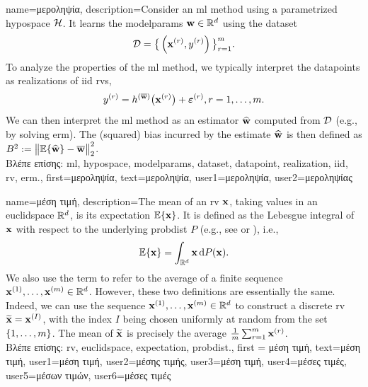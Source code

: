 {name={\foreignlanguage{greek}{μεροληψία}},
	description={Consider an \gls{ml} method using a parametrized \gls{hypospace} $\mathcal{H}$. 
		It learns the \gls{modelparams} ${\bf w} \in \mathbb{R}^{d}$ using the \gls{dataset} 
		$$ \mathcal{D}=\big\{ \left( {\bf x}^{(r)},y^{(r)} \right) \big\}_{r=1}^{m}.$$ 
		To analyze the properties of the \gls{ml} method, we typically interpret the \gls{datapoint}s as \gls{realization}s 
		of \gls{iid} \gls{rv}s, 
		$$ y^{(r)} = h^{(\overline{{\bf w}})}\big( {\bf x}^{(r)} \big) + \bm{\varepsilon}^{(r)}, r=1,\ldots,m.$$ 
		We can then interpret the \gls{ml} method as an estimator $\widehat{{\bf w}}$ 
		computed from $\mathcal{D}$ (e.g., by solving \gls{erm}). The (squared) bias incurred by the estimate $\widehat{{\bf w}}$ 
		is then defined as $B^{2} := \big\| \mathbb{E} \{ \widehat{{\bf w}}  \}- \overline{{\bf w}}\big\|_{2}^{2}$.\\
		\foreignlanguage{greek}{Βλέπε επίσης:} \gls{ml}, \gls{hypospace}, \gls{modelparams}, \gls{dataset}, \gls{datapoint}, \gls{realization}, \gls{iid}, \gls{rv}, \gls{erm}.},
first={\foreignlanguage{greek}{μεροληψία}},
text={\foreignlanguage{greek}{μεροληψία}},
user1={\foreignlanguage{greek}{μεροληψία}}, %
user2={\foreignlanguage{greek}{μεροληψίας}} %
}

{name={\foreignlanguage{greek}{μέση τιμή}},
	description={The  mean of an \gls{rv} ${\bf x}$, taking 
 		values in an \gls{euclidspace} $\mathbb{R}^{d}$, is its 
 		\gls{expectation} $\mathbb{E}\{{\bf x}\}$. It is defined as the Lebesgue 
 		integral of ${\bf x}$ with respect to the underlying \gls{probdist} $P$ (e.g., see \cite{BillingsleyProbMeasure} or \cite{RudinBookPrinciplesMatheAnalysis}), i.e.,
		\[
		\mathbb{E}\{{\bf x}\} = \int_{\mathbb{R}^{d}} {\bf x} \, \mathrm{d}P({\bf x}).
		\] 
		We also use the term to refer to the average of a finite sequence 
		${\bf x}^{(1)}, \ldots, {\bf x}^{(m)} \in \mathbb{R}^{d}$. However, 
		these two definitions are essentially the same. Indeed, we can use the sequence 
		${\bf x}^{(1)}, \ldots, {\bf x}^{(m)} \in \mathbb{R}^{d}$ to construct a 
		discrete \gls{rv} $\widetilde{{\bf x}}={\bf x}^{(I)}$, with the index $I$ being chosen uniformly 
		at random from the set $\{1,\ldots,m\}$. The mean of $\widetilde{{\bf x}}$ is 
		precisely the average $\frac{1}{m} \sum_{r=1}^{m} {\bf x}^{(r)}$.\\
	\foreignlanguage{greek}{Βλέπε επίσης:} \gls{rv}, \gls{euclidspace}, \gls{expectation}, \gls{probdist}.}, 
		first = {\foreignlanguage{greek}{μέση τιμή}}, 
		text={\foreignlanguage{greek}{μέση τιμή}},
		user1={\foreignlanguage{greek}{μέση τιμή}}, %
   		user2={\foreignlanguage{greek}{μέσης τιμής}}, %
		user3={\foreignlanguage{greek}{μέση τιμή}}, %
		user4={\foreignlanguage{greek}{μέσες τιμές}}, %
   		user5={\foreignlanguage{greek}{μέσων τιμών}}, %
		user6={\foreignlanguage{greek}{μέσες τιμές}} %
}

